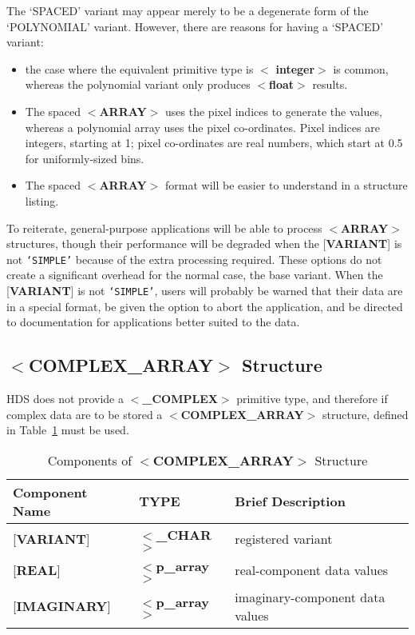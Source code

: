 \documentclass[twoside,11pt]{article}
\newcommand{\xlabel}[1]{}
\begin{document}
The `SPACED' variant may appear merely
to be a degenerate form of the `POLYNOMIAL' variant.  However, there are reasons for
having a `SPACED' variant:
\begin{itemize}
\item the case where the equivalent primitive type is $<${\bf
integer}$>$ is common, whereas the polynomial variant only produces
$<${\bf float}$>$ results. 
\item The spaced $<${\bf ARRAY}$>$ uses the pixel indices
to generate the values, whereas a
polynomial array uses the pixel co-ordinates.  Pixel
indices are integers, starting at 1; pixel
co-ordinates are real numbers, which start at 0.5
for uniformly-sized bins.
\item The spaced $<${\bf ARRAY}$>$ format will be easier to understand
in a structure listing. 
\end{itemize}

To reiterate, general-purpose applications will be able to process
\mbox{$<${\bf ARRAY}$>$} structures, though their performance will be
degraded when the {[}{\bf VARIANT}{]} is not {\tt `SIMPLE'} because of
the extra processing required. These options do not create a significant
overhead for the normal case, the base variant.
When the {[}{\bf VARIANT}{]} is not {\tt `SIMPLE'},
users will probably be warned that their data are in a special format,
be given the option to abort the application, and be directed to
documentation for applications better suited to the data. 

\subsection{\xlabel{se_complex}$<${\bf COMPLEX\_ARRAY}$>$ Structure\label{se:scomplex}}

HDS does not provide a $<${\bf \_COMPLEX}$>$ primitive type, and
therefore if complex data are to be stored a $<${\bf COMPLEX\_ARRAY}$>$
structure, defined in Table~\ref{ta:complex} must be used.

\begin{table}[htb]
\centering
\caption{Components of $<${\bf COMPLEX\_ARRAY}$>$ Structure}
\label{ta:complex}
\begin{tabular}{|l|l|l|}
\hline
Component Name & TYPE & Brief Description \\ \hline
{[}{\bf VARIANT}{]} & $<${\bf \_CHAR}$>$ & registered variant \\
{[}{\bf REAL}{]} & $<${\bf p\_array}$>$ & real-component data values  \\
{[}{\bf IMAGINARY}{]} & $<${\bf p\_array}$>$ & imaginary-component data values \\ \hline
\end{tabular}
\end{table}
\end{document}
